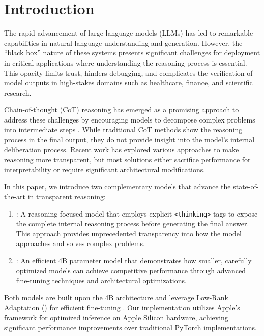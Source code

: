 \section{Introduction}
\label{sec:introduction}

The rapid advancement of large language models (LLMs) has led to remarkable capabilities in natural language understanding and generation. However, the ``black box'' nature of these systems presents significant challenges for deployment in critical applications where understanding the reasoning process is essential. This opacity limits trust, hinders debugging, and complicates the verification of model outputs in high-stakes domains such as healthcare, finance, and scientific research.

Chain-of-thought (CoT) reasoning has emerged as a promising approach to address these challenges by encouraging models to decompose complex problems into intermediate steps \cite{wei2022chain}. While traditional CoT methods show the reasoning process in the final output, they do not provide insight into the model's internal deliberation process. Recent work has explored various approaches to make reasoning more transparent, but most solutions either sacrifice performance for interpretability or require significant architectural modifications.

In this paper, we introduce two complementary models that advance the state-of-the-art in transparent reasoning:

\begin{enumerate}
    \item \textbf{\supra{}}: A reasoning-focused model that employs explicit \texttt{<thinking>} tags to expose the complete internal reasoning process before generating the final answer. This approach provides unprecedented transparency into how the model approaches and solves complex problems.
    
    \item \textbf{\zennano{}}: An efficient 4B parameter model that demonstrates how smaller, carefully optimized models can achieve competitive performance through advanced fine-tuning techniques and architectural optimizations.
\end{enumerate}

Both models are built upon the \qwen{} 4B architecture and leverage Low-Rank Adaptation (\lora{}) for efficient fine-tuning \cite{hu2021lora}. Our implementation utilizes Apple's \mlx{} framework for optimized inference on Apple Silicon hardware, achieving significant performance improvements over traditional PyTorch implementations.

